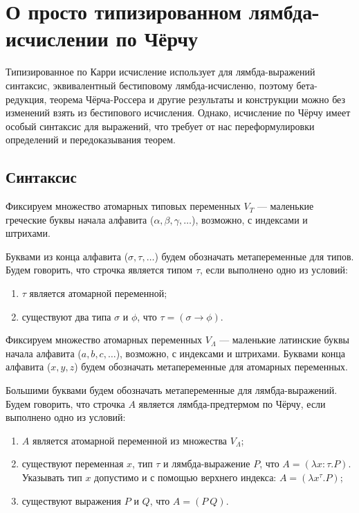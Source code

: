 \documentclass[10pt,a4paper,oneside]{article}
\begin{document}
\section*{О просто типизированном лямбда-исчислении по Чёрчу}

Типизированное по Карри исчисление использует для лямбда-выражений синтаксис, эквивалентный 
бестиповому лямбда-исчисленю, поэтому бета-редукция, теорема Чёрча-Россера и другие результаты
и конструкции можно без изменений взять из бестипового исчисления. Однако, исчисление по
Чёрчу имеет особый синтаксис для выражений, что требует от нас переформулировки определений
и передоказывания теорем.

\subsection{Синтаксис}

Фиксируем множество атомарных типовых переменных $V_T$ --- маленькие греческие буквы начала 
алфавита ($\alpha, \beta, \gamma, \dots$), возможно, с индексами и штрихами. 

Буквами из конца алфавита ($\sigma, \tau, \dots$) будем обозначать метапеременные для типов.
Будем говорить, что строчка является типом $\tau$, если выполнено одно из условий:

\begin{enumerate}
\item $\tau$ является атомарной переменной;
\item существуют два типа $\sigma$ и $\phi$, что $\tau = (\sigma\rightarrow\phi)$.
\end{enumerate}

Фиксируем множество атомарных переменных $V_\Lambda$ --- маленькие латинские буквы начала 
алфавита ($a, b, c, \dots$), возможно, с индексами и штрихами.
Буквами конца алфавита ($x, y, z$) будем обозначать метапеременные для атомарных переменных.

Большими буквами будем обозначать метапеременные для лямбда-выражений.
Будем говорить, что строчка $A$ является лямбда-предтермом по Чёрчу, если выполнено одно из условий:

\begin{enumerate}
\item $A$ является атомарной переменной из множества $V_\Lambda$;
\item существуют переменная $x$, тип $\tau$ и лямбда-выражение $P$, что $A = (\lambda x: \tau.P)$.
Указывать тип $x$ допустимо и с помощью верхнего индекса: $A = (\lambda x^\tau.P)$;
\item существуют выражения $P$ и $Q$, что $A = (P\ Q)$.
\end{enumerate}
\end{document}
